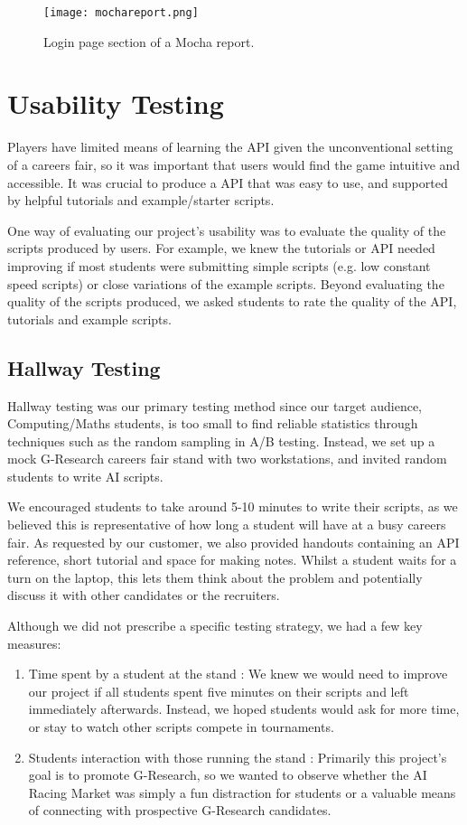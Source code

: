 \begin{figure}[H]
\centering
\texttt{[image: mochareport.png]}
\caption{Login page section of a Mocha report.}
\end{figure}

\section{Usability Testing}

Players have limited means of learning the API given the unconventional setting of a careers fair, so it was important that users would find the game intuitive and accessible. It was crucial to produce a API that was easy to use, and supported by helpful tutorials and example/starter scripts. 

One way of evaluating our project's usability was to evaluate the quality of the scripts produced by users. For example, we knew the tutorials or API needed improving if most students were submitting simple scripts (e.g. low constant speed scripts) or close variations of the example scripts. Beyond evaluating the quality of the scripts produced, we asked students to rate the quality of the API, tutorials and example scripts.

\subsection{Hallway Testing}

Hallway testing was our primary testing method since our target audience, Computing/Maths students, is too small to find reliable statistics through techniques such as the random sampling in A/B testing. Instead, we set up a mock G-Research careers fair stand with two workstations, and invited random students to write AI scripts.

We encouraged students to take around 5-10 minutes to write their scripts, as we believed this is representative of how long a student will have at a busy careers fair. As requested by our customer, we also provided handouts containing an API reference, short tutorial and space for making notes. Whilst a student waits for a turn on the laptop, this lets them think about the problem and potentially discuss it with other candidates or the recruiters. 

Although we did not prescribe a specific testing strategy, we had a few key measures:
\vspace*{-6mm}
\begin{enumerate} \itemsep -1pt 
\item Time spent by a student at the stand : We knew we would need to improve our project if all students spent five minutes on their scripts and left immediately afterwards. Instead, we hoped students would ask for more time, or stay to watch other scripts compete in tournaments.
\item Students interaction with those running the stand : Primarily this project's goal is to promote G-Research, so we wanted to observe whether the AI Racing Market was simply a fun distraction for students or a valuable means of connecting with prospective G-Research candidates.
\end{enumerate}

